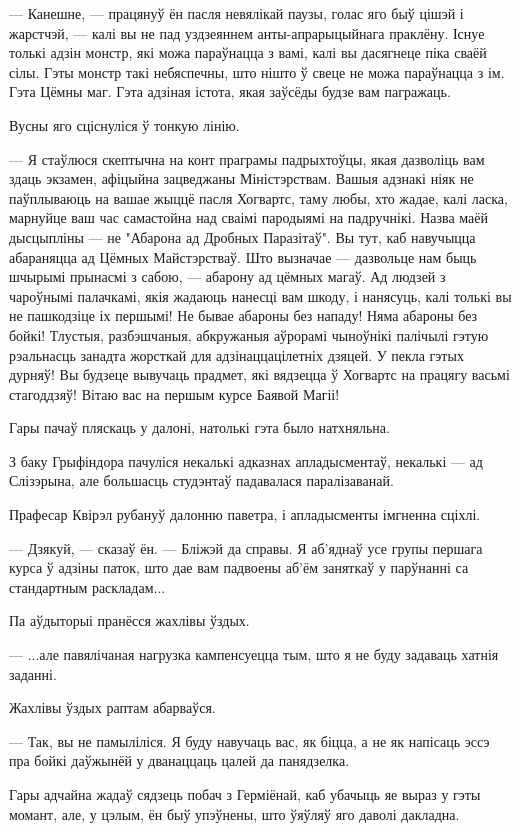 --- Канешне, --- працянуў ён пасля невялікай паузы, голас яго быў цішэй і жарстчэй,
--- калі вы не пад уздзеяннем анты-апрарыцыйнага праклёну. Існуе толькі адзін монстр,
які можа параўнацца з вамі, калі вы дасягнеце піка сваёй сілы. 
Гэты монстр такі небяспечны, што нішто ў  свеце не можа параўнацца з ім.
Гэта Цёмны маг. Гэта адзіная істота, якая заўсёды будзе вам пагражаць.

Вусны яго сціснуліся ў тонкую лінію.

--- Я стаўлюся скептычна на конт праграмы падрыхтоўцы, якая дазволіць вам 
здаць экзамен, афіцыйна зацведжаны Міністэрствам. Вашыя адзнакі ніяк не паўплываюць
на вашае жыццё пасля Хогвартс, таму любы, хто жадае, калі ласка, марнуйце ваш час 
самастойна над сваімі пародыямі на падручнікі. Назва маёй дысцыпліны ---
не "Абарона ад Дробных Паразітаў". Вы тут, каб навучыцца абараняцца ад 
Цёмных Майстэрстваў. Што вызначае --- дазвольце нам быць шчырымі прынасмі 
з сабою, --- абарону ад цёмных магаў. Ад людзей з чароўнымі палачкамі, якія 
жадаюць нанесці вам шкоду, і нанясуць, калі толькі вы не пашкодзіце іх першымі!
Не бывае абароны без нападу! Няма абароны без бойкі! Тлустыя, разбэшчаныя, абкружаныя 
аўрорамі чыноўнікі палічылі гэтую рэальнасць занадта жорсткай для 
адзінаццацілетніх дзяцей. У пекла гэтых дурняў! Вы будзеце вывучаць прадмет,
які вядзецца ў Хогвартс на працягу васьмі стагоддзяў! Вітаю вас на першым курсе 
Баявой Магіі!

Гары пачаў пляскаць у далоні, натолькі гэта было натхняльна.

З баку Грыфіндора пачуліся некалькі адказнах апладысментаў, некалькі --- ад 
Слізэрына, але большасць студэнтаў падавалася паралізаванай.

Прафесар Квірэл рубануў далонню паветра, і апладысменты імгненна сціхлі.

--- Дзякуй, --- сказаў ён. --- Бліжэй да справы. Я аб'яднаў усе групы першага 
курса ў адзіны паток, што дае вам падвоены аб'ём заняткаў у парўнанні са стандартным 
раскладам... 

Па аўдыторыі пранёсся жахлівы ўздых.

--- ...але павялічаная нагрузка кампенсуецца тым, што я не буду задаваць 
хатнія заданні.

Жахлівы ўздых раптам абарваўся.

--- Так, вы не памыліліся. Я буду навучаць вас, як біцца, а не як напісаць 
эссэ пра бойкі даўжынёй у дванаццаць цалей да панядзелка.

Гары адчайна жадаў сядзець побач з Герміёнай, каб убачыць яе выраз у гэты момант,
але, у цэлым, ён быў упэўнены, што ўяўляў яго даволі дакладна.

